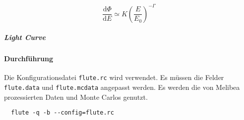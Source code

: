 
\begin{equation}
\frac{\text{d} \Phi}{\text{d}E} \simeq K {\left( \frac{E}{E_0} \right)}^{- \Gamma}
\end{equation}

\subparagraph{Light Curve}

\paragraph{Durchführung}%

Die Konfigurationsdatei \texttt{flute.rc} wird verwendet.
Es müssen die Felder \texttt{flute.data} und \texttt{flute.mcdata} angepasst werden.
Es werden die von Melibea prozessierten Daten und Monte Carlos genutzt.


\begin{lstlisting}
  flute -q -b --config=flute.rc
\end{lstlisting}
